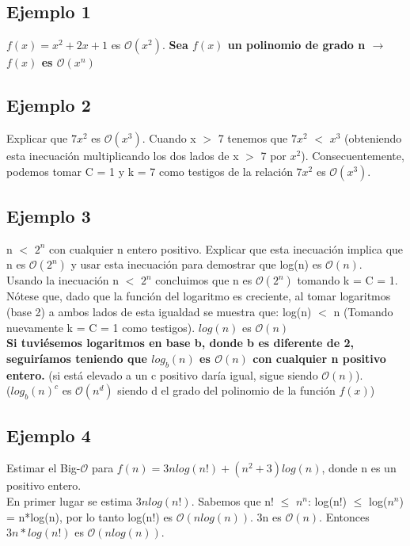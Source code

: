 \documentclass{article}
\begin{document}
\subsection{Ejemplo 1}
$f(x) = x^{2}+2x+1$ es $\mathcal{O}(x^2)$. \textbf{Sea $f(x)$ un polinomio de grado n $\xrightarrow{}$ $f(x)$ es $\mathcal{O}(x^n)$} 

\subsection{Ejemplo 2}
Explicar que $7x^2$ es $\mathcal{O}(x^3)$. Cuando x $>$ 7 tenemos que $7x^2$ $<$ $x^3$ (obteniendo esta inecuación multiplicando los dos lados de x $>$ 7 por $x^2$). Consecuentemente, podemos tomar C = 1 y k = 7 como testigos de la relación $7x^2$ es $\mathcal{O}(x^3)$.  

\newpage

\subsection{Ejemplo 3}
n $<$ $2^n$ con cualquier n entero positivo. Explicar que esta inecuación implica que n es $\mathcal{O}(2^n)$ y usar esta inecuación para demostrar que log(n) es $\mathcal{O}(n)$. \\

Usando la inecuación n $<$ $2^n$ concluimos que n es $\mathcal{O}(2^n)$ tomando k = C = 1. Nótese que, dado que la función del logaritmo es creciente, al tomar logaritmos (base 2) a ambos lados de esta igualdad se muestra que: log(n) $<$ n (Tomando nuevamente k = C = 1 como testigos). $log(n)$ es $\mathcal{O}(n)$\\

\textbf{Si tuviésemos logaritmos en base b, donde b es diferente de 2, seguiríamos teniendo que $log_b(n)$ es $\mathcal{O}(n)$ con cualquier n positivo entero.} (si está elevado a un c positivo daría igual, sigue siendo $\mathcal{O}(n)$). \\
($log_b(n)^c$ es $\mathcal{O}(n^d)$ siendo d el grado del polinomio de la función $f(x)$)

\subsection{Ejemplo 4}
Estimar el Big-$\mathcal{O}$ para $f(n)=3nlog(n!)+(n^2+3)log(n)$, donde n es un positivo entero. \\

En primer lugar se estima $3nlog(n!)$. Sabemos que n! $\leq$ $n^n$: log(n!) $\leq$ log($n^n$) = n*log(n), por lo tanto log(n!) es $\mathcal{O}(nlog(n))$. 3n es $\mathcal{O}(n)$. Entonces  $3n*log(n!)$ es $\mathcal{O}(nlog(n))$. \\
\end{document}
